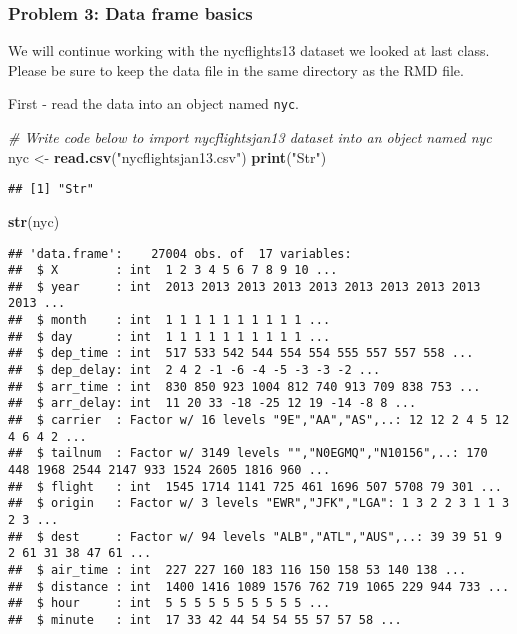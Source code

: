 \documentclass[]{article}
\newenvironment{Shaded}{\begin{snugshade}}{\end{snugshade}}
\newcommand{\KeywordTok}[1]{\textcolor[rgb]{0.13,0.29,0.53}{\textbf{#1}}}
\newcommand{\StringTok}[1]{\textcolor[rgb]{0.31,0.60,0.02}{#1}}
\newcommand{\CommentTok}[1]{\textcolor[rgb]{0.56,0.35,0.01}{\textit{#1}}}
\newcommand{\NormalTok}[1]{#1}
\begin{document}
\subsubsection{Problem 3: Data frame
basics}\label{problem-3-data-frame-basics}

We will continue working with the nycflights13 dataset we looked at last
class. Please be sure to keep the data file in the same directory as the
RMD file.

First - read the data into an object named \texttt{nyc}.

\begin{Shaded}
\begin{Highlighting}[]
\CommentTok{# Write code below to import nycflightsjan13 dataset into an object named nyc}
\NormalTok{nyc <-}\StringTok{ }\KeywordTok{read.csv}\NormalTok{(}\StringTok{"nycflightsjan13.csv"}\NormalTok{)}
\KeywordTok{print}\NormalTok{(}\StringTok{"Str"}\NormalTok{)}
\end{Highlighting}
\end{Shaded}

\begin{verbatim}
## [1] "Str"
\end{verbatim}

\begin{Shaded}
\begin{Highlighting}[]
\KeywordTok{str}\NormalTok{(nyc)}
\end{Highlighting}
\end{Shaded}

\begin{verbatim}
## 'data.frame':    27004 obs. of  17 variables:
##  $ X        : int  1 2 3 4 5 6 7 8 9 10 ...
##  $ year     : int  2013 2013 2013 2013 2013 2013 2013 2013 2013 2013 ...
##  $ month    : int  1 1 1 1 1 1 1 1 1 1 ...
##  $ day      : int  1 1 1 1 1 1 1 1 1 1 ...
##  $ dep_time : int  517 533 542 544 554 554 555 557 557 558 ...
##  $ dep_delay: int  2 4 2 -1 -6 -4 -5 -3 -3 -2 ...
##  $ arr_time : int  830 850 923 1004 812 740 913 709 838 753 ...
##  $ arr_delay: int  11 20 33 -18 -25 12 19 -14 -8 8 ...
##  $ carrier  : Factor w/ 16 levels "9E","AA","AS",..: 12 12 2 4 5 12 4 6 4 2 ...
##  $ tailnum  : Factor w/ 3149 levels "","N0EGMQ","N10156",..: 170 448 1968 2544 2147 933 1524 2605 1816 960 ...
##  $ flight   : int  1545 1714 1141 725 461 1696 507 5708 79 301 ...
##  $ origin   : Factor w/ 3 levels "EWR","JFK","LGA": 1 3 2 2 3 1 1 3 2 3 ...
##  $ dest     : Factor w/ 94 levels "ALB","ATL","AUS",..: 39 39 51 9 2 61 31 38 47 61 ...
##  $ air_time : int  227 227 160 183 116 150 158 53 140 138 ...
##  $ distance : int  1400 1416 1089 1576 762 719 1065 229 944 733 ...
##  $ hour     : int  5 5 5 5 5 5 5 5 5 5 ...
##  $ minute   : int  17 33 42 44 54 54 55 57 57 58 ...
\end{verbatim}
\end{document}
